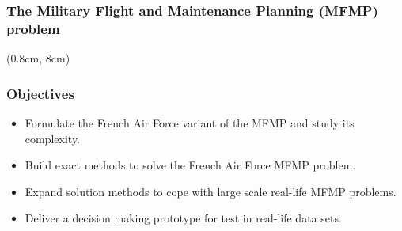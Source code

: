 \begin{frame}[t]
\frametitle{\textbf{The Military Flight and Maintenance Planning (MFMP) problem}}
  \begin{tikzpicture}
    
  \end{tikzpicture}

  \begin{textblock*}{1.1\textwidth}(0.8cm, 8cm)
    \begin{flushleft}
    \end{flushleft}
  \end{textblock*}
\end{frame}

\begin{frame}
\frametitle{\textbf{Objectives}}
  \begin{itemize}[<+->]
  \item 
    Formulate the French Air Force variant of the MFMP and study its complexity.
  \item
    Build exact methods to solve the French Air Force MFMP problem.
  \item
    Expand solution methods to cope with large scale real-life MFMP problems.
  \item
    Deliver a decision making prototype for test in real-life data sets.
  \end{itemize}
\end{frame}
 

  




